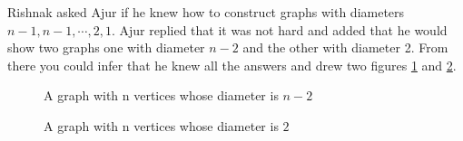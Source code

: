Rishnak asked Ajur if he knew how to construct graphs with diameters $n-1, n-1, \cdots, 2, 1$. Ajur replied that it was not hard and added that he would show two graphs one with diameter $n-2$ and the other with diameter 2. From there you could infer that he knew all the answers and drew two figures \ref{12g5} and \ref{12g6}.
\begin{figure}
\begin{center}
\caption{ A graph with n vertices whose diameter is $n-2$ }\label{12g5}
\end{center}
\end{figure}
\begin{figure}
 \begin{center}
\caption{ A graph with n vertices whose diameter is $2$ }\label{12g6}
\end{center}
\end{figure}


